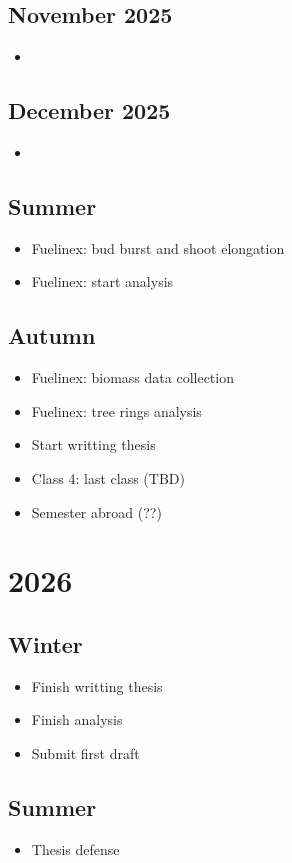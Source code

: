 \documentclass{article}
\begin{document}
\subsection {November 2025}
\begin {itemize}
	\item \textbf{}
\end {itemize}

\subsection {December 2025}
\begin {itemize}
	\item \textbf{}
\end {itemize}


\subsection {Summer}
\begin {itemize}
	\item Fuelinex: bud burst and shoot elongation
	\item Fuelinex: start analysis
\end {itemize}

\subsection {Autumn}
\begin {itemize}
	\item Fuelinex: biomass data collection
	\item Fuelinex: tree rings analysis 
	\item Start writting thesis 
	\item Class 4: last class (TBD)
	\item Semester abroad (??)
\end {itemize}

\section {2026}
\subsection {Winter}
\begin {itemize}
	\item Finish writting thesis
	\item Finish analysis
	\item Submit first draft
\end {itemize}

\subsection {Summer}
\begin {itemize}
	\item Thesis defense
\end {itemize}


\end{document}
